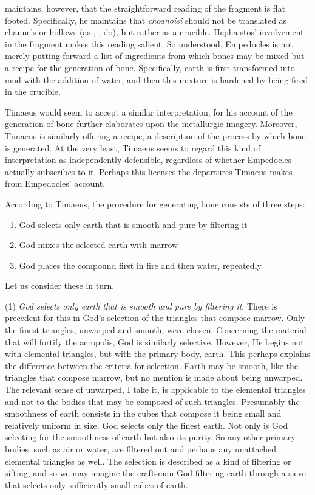 \citet[301-2]{Palmer:2009qf} maintains, however, that the straightforward reading of the fragment is flat footed. Specifically, he maintains that \emph{choanoisi} should not be translated as channels or hollows (as \citealt[151 n1]{Guthrie:1965ys}, \citealt[208--9]{Wright:1981zr}, \citealt[62 245]{Inwood:2001ve} do), but rather as a crucible. Hephaistos' involvement in the fragment makes this reading salient. So understood, Empedocles is not merely putting forward a list of ingredients from which bones may be mixed but a recipe for the generation of bone. Specifically, earth is first transformed into mud with the addition of water, and then this mixture is hardened by being fired in the crucible.

Timaeus would seem to accept a similar interpretation, for his account of the generation of bone further elaborates upon the metallurgic imagery. Moreover, Timaeus is similarly offering a recipe, a description of the process by which bone is generated. At the very least, Timaeus seems to regard this kind of interpretation as independently defensible, regardless of whether Empedocles actually subscribes to it. Perhaps this licenses the departures Timaeus makes from Empedocles' account. 

According to Timaeus, the procedure for generating bone consists of three steps:
\begin{enumerate}[(1)]
	\item God selects only earth that is smooth and pure by filtering it
	\item God mixes the selected earth with marrow
	\item God places the compound first in fire and then water, repeatedly
\end{enumerate}
Let us consider these in turn.

(1) \emph{God selects only earth that is smooth and pure by filtering it}. There is precedent for this in God's selection of the triangles that compose marrow. Only the finest triangles, unwarped and smooth, were chosen. Concerning the material that will fortify the acropolis, God is similarly selective. However, He begins not with elemental triangles, but with the primary body, earth. This perhaps explains the difference between the criteria for selection. Earth may be smooth, like the triangles that compose marrow, but no mention is made about being unwarped. The relevant sense of unwarped, I take it, is applicable to the elemental triangles and not to the bodies that may be composed of such triangles. Presumably the smoothness of earth consists in the cubes that compose it being small and relatively uniform in size. God selects only the finest earth. Not only is God selecting for the smoothness of earth but also its purity. So any other primary bodies, such as air or water, are filtered out and perhaps any unattached elemental triangles as well. The selection is described as a kind of filtering or sifting, and so we may imagine the craftsman God filtering earth through a sieve that selects only sufficiently small cubes of earth.

